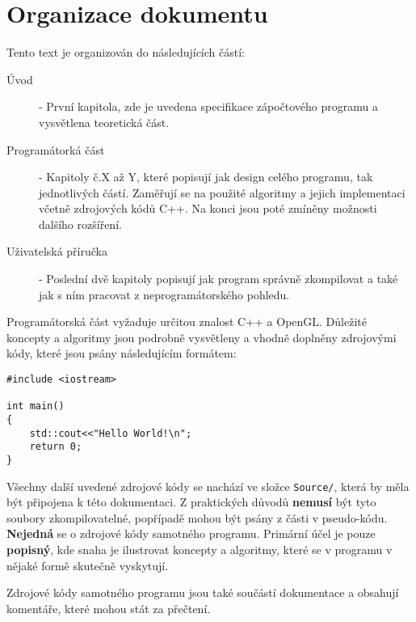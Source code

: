 
\chapter*{Organizace dokumentu}
Tento text je organizován do následujících částí:
\begin{description}
	\item[Úvod] - První kapitola, zde je uvedena specifikace zápočtového programu a vysvětlena teoretická část.
	\item[Programátorká část] - Kapitoly č.X až Y, které popisují jak design celého programu, tak jednotlivých částí. Zaměřují se na použité algoritmy a jejich implementaci včetně zdrojových kódů C++. Na konci jsou poté zmíněny možnosti dalšího rozšíření.
	\item[Uživatelská příručka] - Poslední dvě kapitoly popisují jak program správně zkompilovat a také jak s ním pracovat z neprogramátorského pohledu.
	
\end{description}
Programátorská část vyžaduje určitou znalost C++ a OpenGL. Důležité koncepty a algoritmy jsou podrobně vysvětleny a vhodně doplněny zdrojovými kódy, které jsou psány následujícím formátem:
\begin{lstlisting}[title=Text vystihující příklad (Název souboru)]
#include <iostream>

int main()
{
	std::cout<<"Hello World!\n";
	return 0;
}
\end{lstlisting}
Všechny další uvedené zdrojové kódy se nachází ve složce \texttt{Source/}, která
by měla být připojena k této dokumentaci. Z praktických důvodů \textbf{nemusí} být tyto soubory zkompilovatelné, popřípadě mohou být psány z části v pseudo-kódu. \textbf{Nejedná} se o zdrojové kódy samotného programu. Primární účel je pouze \textbf{popisný}, kde snaha je ilustrovat koncepty a algoritmy, které se v programu v nějaké formě skutečně vyskytují.

Zdrojové kódy samotného programu jsou také součástí dokumentace a obsahují komentáře, které mohou stát za přečtení.


